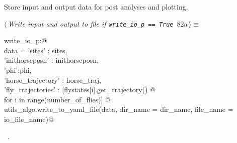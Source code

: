 \documentclass[11.5pt]{report}
\begin{document}
\vspace{-0.8cm} \newchunk Store input and output data for post analyses and plotting. 
\begin{flushleft} \small\label{scrap130}\raggedright\small
{} $\langle\,${\itshape Write input and output to file if \verb|write_io_p == True|}\nobreak\ {\footnotesize {82a}}$\,\rangle\equiv$
\vspace{-1ex}
\begin{list}{}{} \item
\mbox{}\verb@if write_io_p:@\\
\mbox{}\verb@     data = { 'sites' : sites, \@\\
\mbox{}\verb@              'inithorseposn' : inithorseposn,\@\\
\mbox{}\verb@              'phi':phi,\@\\
\mbox{}\verb@              'horse_trajectory' : horse_traj, \@\\
\mbox{}\verb@              'fly_trajectories' : [flystates[i].get_trajectory() @\\
\mbox{}\verb@                                   for i in range(number_of_flies)] }@\\
\mbox{}\verb@     utils_algo.write_to_yaml_file(data, dir_name = dir_name, file_name = io_file_name)@\\
\mbox{}\verb@@{\NWsep}
\end{list}
\vspace{-1.5ex}
\footnotesize
\begin{list}{}{\setlength{\itemsep}{-\parsep}\setlength{\itemindent}{-\leftmargin}}
\item \NWtxtMacroRefIn\ .

\item{}
\end{list}
\vspace{4ex}
\end{flushleft}
\end{document}
